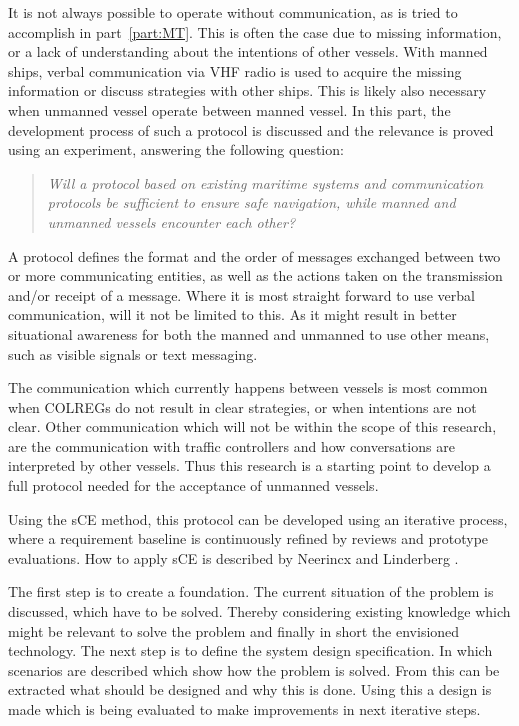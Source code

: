 It is not always possible to operate without communication, as is tried to accomplish in part~\ref{part:MT}. This is often the case due to missing information, or a lack of understanding about the intentions of other vessels. With manned ships, verbal communication via \ac{VHF} radio is used to acquire the missing information or discuss strategies with other ships. This is likely also necessary when unmanned vessel operate between manned vessel. In this part, the development process of such a protocol is discussed and the relevance is proved using an experiment, answering the following question:

\begin{quotation}
	\emph{Will a protocol based on existing maritime systems and communication protocols be sufficient to ensure safe navigation, while manned and unmanned vessels encounter each other?}
\end{quotation}

A protocol defines the format and the order of messages exchanged between two or more communicating entities, as well as the actions taken on the transmission and/or receipt of a message. Where it is most straight forward to use verbal communication, will it not be limited to this. As it might result in better situational awareness for both the manned and unmanned to use other means, such as visible signals or text messaging.

The communication which currently happens between vessels is most common when \ac{COLREGs} do not result in clear strategies, or when intentions are not clear. Other communication which will not be within the scope of this research, are the communication with traffic controllers and how conversations are interpreted by other vessels.
Thus this research is a starting point to develop a full protocol needed for the acceptance of unmanned vessels.

Using the \acf{sCE} method, this protocol can be developed using an iterative process, where a  requirement baseline is continuously refined by reviews and prototype evaluations. How to apply \ac{sCE} is described by Neerincx and Linderberg \cite{Neerincx2012}.

The first step is to create a foundation. The current situation of the problem is discussed, which have to be solved. Thereby considering existing knowledge which might be relevant to solve the problem and finally in short the envisioned technology. The next step is to define the system design specification. In which scenarios are described which show how the problem is solved. From this can be extracted what should be designed and why this is done. Using this a design is made which is being evaluated to make improvements in next iterative steps.